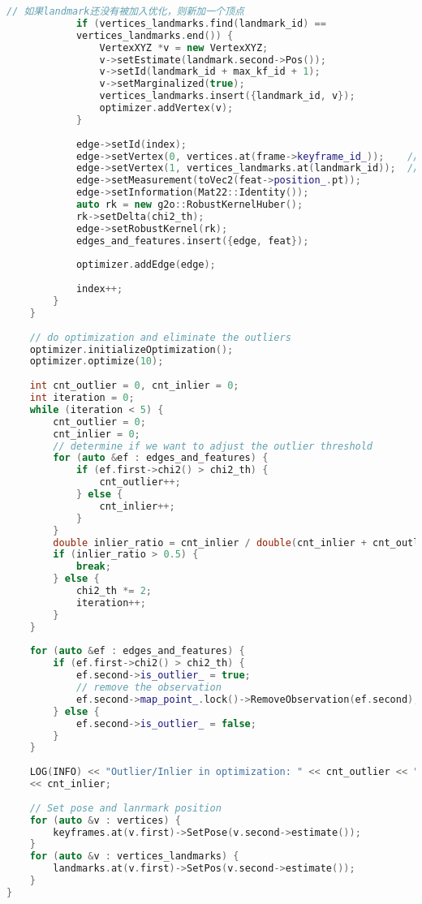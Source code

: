 \begin{lstlisting}[language=c++,caption=slambook2/ch13/src/backend.cpp]
            // 如果landmark还没有被加入优化，则新加一个顶点
            if (vertices_landmarks.find(landmark_id) ==
            vertices_landmarks.end()) {
                VertexXYZ *v = new VertexXYZ;
                v->setEstimate(landmark.second->Pos());
                v->setId(landmark_id + max_kf_id + 1);
                v->setMarginalized(true);
                vertices_landmarks.insert({landmark_id, v});
                optimizer.addVertex(v);
            }
            
            edge->setId(index);
            edge->setVertex(0, vertices.at(frame->keyframe_id_));    // pose
            edge->setVertex(1, vertices_landmarks.at(landmark_id));  // landmark
            edge->setMeasurement(toVec2(feat->position_.pt));
            edge->setInformation(Mat22::Identity());
            auto rk = new g2o::RobustKernelHuber();
            rk->setDelta(chi2_th);
            edge->setRobustKernel(rk);
            edges_and_features.insert({edge, feat});
            
            optimizer.addEdge(edge);
            
            index++;
        }
    }
    
    // do optimization and eliminate the outliers
    optimizer.initializeOptimization();
    optimizer.optimize(10);
    
    int cnt_outlier = 0, cnt_inlier = 0;
    int iteration = 0;
    while (iteration < 5) {
        cnt_outlier = 0;
        cnt_inlier = 0;
        // determine if we want to adjust the outlier threshold
        for (auto &ef : edges_and_features) {
            if (ef.first->chi2() > chi2_th) {
                cnt_outlier++;
            } else {
                cnt_inlier++;
            }
        }
        double inlier_ratio = cnt_inlier / double(cnt_inlier + cnt_outlier);
        if (inlier_ratio > 0.5) {
            break;
        } else {
            chi2_th *= 2;
            iteration++;
        }
    }
    
    for (auto &ef : edges_and_features) {
        if (ef.first->chi2() > chi2_th) {
            ef.second->is_outlier_ = true;
            // remove the observation
            ef.second->map_point_.lock()->RemoveObservation(ef.second);
        } else {
            ef.second->is_outlier_ = false;
        }
    }
    
    LOG(INFO) << "Outlier/Inlier in optimization: " << cnt_outlier << "/"
    << cnt_inlier;
    
    // Set pose and lanrmark position
    for (auto &v : vertices) {
        keyframes.at(v.first)->SetPose(v.second->estimate());
    }
    for (auto &v : vertices_landmarks) {
        landmarks.at(v.first)->SetPos(v.second->estimate());
    }
}
\end{lstlisting}

